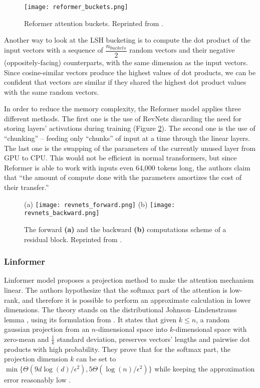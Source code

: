 \begin{figure}[!htb]
        \centering
        \texttt{[image: reformer\_buckets.png]}
        \caption[Reformer Attention Visualization]{Reformer attention buckets. Reprinted from \citep{reformer}.}
        \label{fig:reformer_buckets}
\end{figure}

Another way to look at the LSH bucketing is to compute the dot product of the input vectors with a sequence of $\dfrac{n_{buckets}}{2}$ random vectors and their negative (oppositely-facing) counterparts, with the same dimension as the input vectors.
Since cosine-similar vectors produce the highest values of dot products, we can be confident that vectors are similar if they shared the highest dot product values with the same random vectors.

In order to reduce the memory complexity, the Reformer model applies three different methods.
The first one is the use of RevNets \citep{revnets} discarding the need for storing layers' activations during training (Figure \ref{fig:revnets}). The second one is the use of ``chunking'' -- feeding only ``chunks'' of input at a time through the linear layers.
The last one is the swapping of the parameters of the currently unused layer from GPU to CPU. This would not be efficient in normal transformers, but since Reformer is able to work with inputs even 64,000 tokens long, the authors claim that ``the amount of compute done with the parameters amortizes the cost of their transfer.''

\begin{figure}[!htb]
        \centering
        (a)
        \texttt{[image: revnets\_forward.png]}
        (b)
        \texttt{[image: revnets\_backward.png]}
        \caption[RevNet Scheme]{The forward \textbf{(a)} and the backward \textbf{(b)} computations scheme of a residual block. Reprinted from \citep{revnets}.}
        \label{fig:revnets}
\end{figure}

\subsubsection{Linformer}

Linformer model \citep{linformer} proposes a projection method to make the attention mechanism linear.
The authors hypothesize that the softmax part of the attention is low-rank, and therefore it is possible to perform an approximate calculation in lower dimensions. The theory stands on the distributional
Johnson–Lindenstrauss lemma \citep{JL-lemma}, using its formulation from \citep{JL-formulation}. 
It states that given $k\leq n$, a random gaussian projection from an $n$-dimensional space into $k$-dimensional space with zero-mean and $\frac{1}{k}$ standard deviation, preserves vectors' lengths and pairwise dot products with high probability.
They prove that for the softmax part, the projection dimension $k$ can be set to $\min\{\Theta(9d\log(d)/\epsilon^2),5\Theta(\log(n)/\epsilon^2)\}$ while keeping the approximation error reasonably low \citep[Theorem 2]{linformer}.

